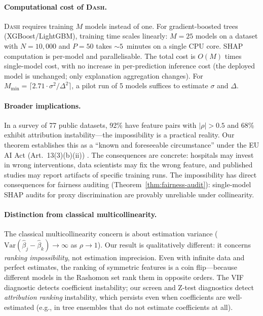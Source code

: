 \documentclass{article}
\newcommand{\Var}{\mathrm{Var}}
\newcommand{\DASH}{\textsc{Dash}}
\begin{document}
\paragraph{Computational cost of \DASH{}.}
\DASH{} requires training $M$ models instead of one. For gradient-boosted trees (XGBoost/LightGBM), training time scales linearly: $M = 25$ models on a dataset with $N = 10{,}000$ and $P = 50$ takes ${\sim}5$~minutes on a single CPU core. SHAP computation is per-model and parallelisable. The total cost is $O(M)$ times single-model cost, with no increase in per-prediction inference cost (the deployed model is unchanged; only explanation aggregation changes). For $M_{\min} = \lceil 2.71 \cdot \sigma^2/\Delta^2 \rceil$, a pilot run of 5 models suffices to estimate $\sigma$ and $\Delta$.

\paragraph{Broader implications.}
\begin{sloppypar}
In a survey of 77 public datasets, 92\% have feature pairs with $|\rho| > 0.5$ and
68\% exhibit attribution instability---the impossibility is a practical
reality. Our theorem establishes this as a ``known and foreseeable circumstance'' under the
EU AI Act (Art.~13(3)(b)(ii)) \citep{euaiact2024}.
The consequences are concrete: hospitals may invest in wrong interventions, data
scientists may fix the wrong feature, and published studies may report artifacts of
specific training runs.
The impossibility has direct consequences for fairness auditing
(Theorem~\ref{thm:fairness-audit}): single-model SHAP audits for proxy discrimination
are provably unreliable under collinearity.
\end{sloppypar}

\paragraph{Distinction from classical multicollinearity.}
The classical multicollinearity concern is about estimation variance ($\Var(\hat\beta_j - \hat\beta_k) \to \infty$ as $\rho \to 1$). Our result is qualitatively different: it concerns \emph{ranking impossibility}, not estimation imprecision. Even with infinite data and perfect estimates, the ranking of symmetric features is a coin flip---because different models in the Rashomon set rank them in opposite orders. The VIF diagnostic detects coefficient instability; our screen and Z-test diagnostics detect \emph{attribution ranking} instability, which persists even when coefficients are well-estimated (e.g., in tree ensembles that do not estimate coefficients at all).
\end{document}
